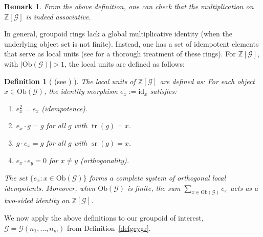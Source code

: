 \documentclass[a4paper,12pt]{article}
\newtheorem{definition}{Definition}[section]
\newtheorem{remark}{Remark}[section]
\newcommand{\Z}{\mathbb{Z}}
\newcommand{\calG}{\mathcal{G}}
\newcommand{\Ob}{\mathrm{Ob}}
\begin{document}
\begin{remark}
From the above definition, one can check that the multiplication on $\Z[\calG]$ is indeed associative. 
\end{remark}



In general, groupoid rings lack a global multiplicative identity (when the underlying object set is not finite).  Instead, one has a set of idempotent elements that serve as local units (see \cite{Wisbauer1991} for a thorough treatment of these rings).  For  $\Z[\calG]$, with $|\Ob(\calG)| > 1$, the local units are defined as follows: 

\begin{definition}[ (see \cite{Wisbauer1991}) ]  
\label{ludef}
The \emph{local units} of $\Z[\calG]$ are defined as:       
For each object $x \in \Ob(\calG)$, the identity morphism
$e_x := \mathrm{id}_x$ satisfies:
\begin{enumerate}  
  \item $e_x^2 = e_x$ (idempotence).
  \item $e_x \cdot g = g$ for all $g$ with $\operatorname{tr}(g) = x$.
  \item $g \cdot e_x = g$ for all $g$ with $\operatorname{sr}(g) = x$.
  \item $e_x \cdot e_y = 0$ for $x \neq y$ (orthogonality).
\end{enumerate}
The set $\{e_x : x \in \Ob(\calG)\}$ forms a complete system of
orthogonal local idempotents. Moreover, when $\Ob(\calG)$ is finite, the sum
$\sum_{x \in \Ob(\calG)} e_x$ acts as a two-sided identity on
$\Z[\calG]$.   
\end{definition}


We now apply the above definitions to our groupoid of interest, $\calG = \calG(n_1, \ldots, n_m)$ from Definition~\ref{defgcygr}.  
\end{document}
